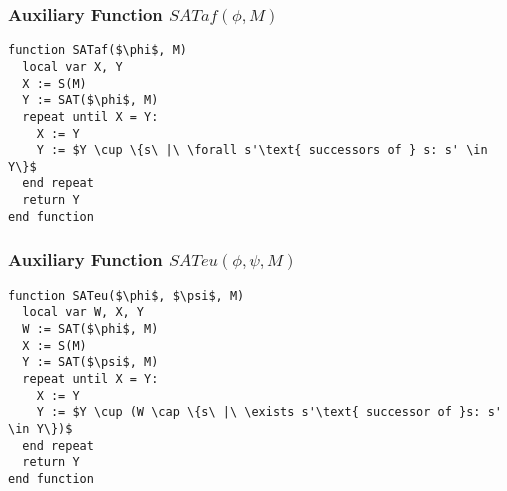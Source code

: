 \documentclass{article}
\theoremstyle{plain}
\theoremstyle{definition}
\begin{document}
\begin{multicols}{2}
\subsubsection{Auxiliary Function $SATaf(\phi, M)$}

\begin{lstlisting}[mathescape=true]
function SATaf($\phi$, M)
  local var X, Y
  X := S(M)
  Y := SAT($\phi$, M)
  repeat until X = Y:
    X := Y
    Y := $Y \cup \{s\ |\ \forall s'\text{ successors of } s: s' \in Y\}$
  end repeat
  return Y
end function
\end{lstlisting}

\subsubsection{Auxiliary Function $SATeu(\phi, \psi, M)$}

\begin{lstlisting}[mathescape=true]
function SATeu($\phi$, $\psi$, M)
  local var W, X, Y
  W := SAT($\phi$, M)
  X := S(M)
  Y := SAT($\psi$, M)
  repeat until X = Y:
    X := Y
    Y := $Y \cup (W \cap \{s\ |\ \exists s'\text{ successor of }s: s' \in Y\})$
  end repeat
  return Y
end function
\end{lstlisting}


\end{multicols}
\end{document}
